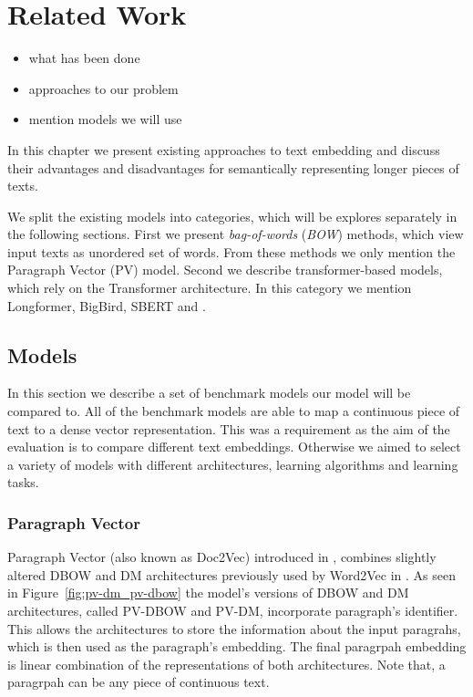 \chapter{Related Work}

\begin{itemize}
    \item what has been done
    \item approaches to our problem
    \item mention models we will use
\end{itemize}

In this chapter we present existing approaches to text embedding and discuss
their advantages and disadvantages for semantically representing longer pieces
of texts.

We split the existing models into categories, which will be explores separately
in the following sections. First we present \emph{bag-of-words} (\emph{BOW})
methods, which view input texts as unordered set of words. From these methods
we only mention the Paragraph Vector (PV) model. Second we describe
transformer-based models, which rely on the Transformer architecture. In this
category we mention Longformer, BigBird, SBERT and .


\section{Models}

In this section we describe a set of benchmark models our model will be compared
to. All of the benchmark models are able to map a continuous piece of text to a
dense vector representation. This was a requirement as the aim of the evaluation
is to compare different text embeddings. Otherwise we aimed to select a variety
of models with different architectures, learning algorithms and learning tasks.

\subsection{Paragraph Vector}

Paragraph Vector (also known as Doc2Vec) introduced in \cite{le2014distributed},
combines slightly altered DBOW and DM architectures previously used by Word2Vec
in \cite{mikolov2013efficient}. As seen in Figure~\ref{fig:pv-dm_pv-dbow} the
model's versions of DBOW and DM architectures, called PV-DBOW and PV-DM,
incorporate paragraph's identifier. This allows the architectures to store the
information about the input paragrahs, which is then used as the paragraph's
embedding. The final paragrpah embedding is linear combination of the
representations of both architectures. Note that, a paragrpah can be any piece
of continuous text.

